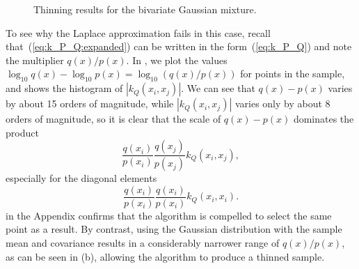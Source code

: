 \documentclass[11pt,a4paper]{report}
\begin{document}
\begin{figure}[h!]
\centering
{}
\caption{Thinning results for the bivariate Gaussian mixture.
\label{fig:gmm:thinned}}
\end{figure}

To see why the Laplace approximation fails in this case, recall that~(\ref{eq:k_P_Q:expanded}) can be written in the form~(\ref{eq:k_P_Q}) and note the multiplier $q(x) / p(x)$. In , we plot the values $\log_{10} q(x) - \log_{10} p(x) = \log_{10} (q(x) / p(x))$ for points in the sample, and  shows the histogram of $|k_Q(x_i, x_j)|$. We can see that $q(x) - p(x)$ varies by about 15 orders of magnitude, while $|k_Q(x_i, x_j)|$ varies only by about 8 orders of magnitude, so it is clear that the scale of $q(x) - p(x)$ dominates the product
\begin{equation*}
\frac{q(x_i)}{p(x_i)} \frac{q(x_j)}{p(x_j)} k_Q(x_i, x_j),
\end{equation*}
especially for the diagonal elements
\begin{equation*}
\frac{q(x_i)}{p(x_i)} \frac{q(x_i)}{p(x_i)} k_Q(x_i, x_i).
\end{equation*}
 in the Appendix confirms that the algorithm is compelled to select the same point as a result. By contrast, using the Gaussian distribution with the sample mean and covariance results in a considerably narrower range of $q(x) / p(x)$, as can be seen in (b), allowing the algorithm to produce a thinned sample.
\end{document}
